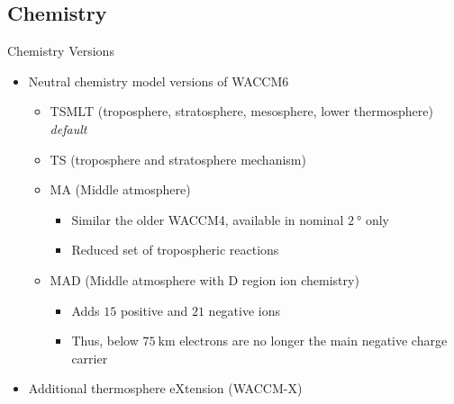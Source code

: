 \documentclass[xcolor=dvipsnames]{beamer} %
\begin{document}
\subsection{Chemistry}
\begin{frame}{Chemistry Versions}
  \begin{itemize}[<+->]
    \item Neutral chemistry model versions of WACCM6
          \begin{itemize}
            \item TSMLT (troposphere, stratosphere, mesosphere, lower thermosphere) \textit{default}
            \item TS (troposphere and stratosphere mechanism)
            \item MA (Middle atmosphere)\begin{itemize}
                    \item Similar the older WACCM4, available in nominal $ \SI{2}{\degree} $ only %
                    \item Reduced set of tropospheric reactions
                  \end{itemize}
            \item MAD (Middle atmosphere with D region ion chemistry)
                  \begin{itemize}
                    \item Adds $ 15 $ positive and $ 21 $ negative ions %
                    \item Thus, below $ \SI{75}{\kilo\metre} $ electrons are no longer the main
                          negative charge carrier %
                  \end{itemize}
          \end{itemize}
    \item Additional thermosphere eXtension (WACCM-X)
  \end{itemize}
\end{frame}
\end{document}
